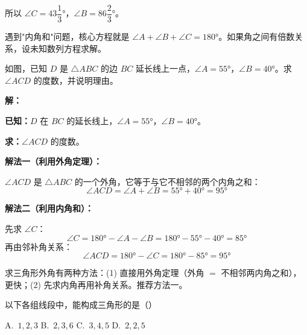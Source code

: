 \documentclass[12pt, a4paper]{ctexart}
\begin{document}
所以 $\angle C = 43\dfrac{1}{3}°$，$\angle B = 86\dfrac{2}{3}°$。

\begin{tipbox}[方法总结]
遇到"内角和"问题，核心方程就是 $\angle A + \angle B + \angle C = 180°$。如果角之间有倍数关系，设未知数列方程求解。
\end{tipbox}

\begin{examplebox}
如图，已知 $D$ 是 $\triangle ABC$ 的边 $BC$ 延长线上一点，$\angle A = 55°$，$\angle B = 40°$。求 $\angle ACD$ 的度数，并说明理由。

\begin{center}
\end{center}
\end{examplebox}

\textbf{解：}

\textbf{已知：}$D$ 在 $BC$ 的延长线上，$\angle A = 55°$，$\angle B = 40°$。

\textbf{求：}$\angle ACD$ 的度数。

\textbf{解法一（利用外角定理）：}

$\angle ACD$ 是 $\triangle ABC$ 的一个外角，它等于与它不相邻的两个内角之和：
\[
\angle ACD = \angle A + \angle B = 55° + 40° = 95°
\]

\textbf{解法二（利用内角和）：}

先求 $\angle C$：
\[
\angle C = 180° - \angle A - \angle B = 180° - 55° - 40° = 85°
\]
再由邻补角关系：
\[
\angle ACD = 180° - \angle C = 180° - 85° = 95°
\]

\begin{tipbox}[方法总结]
求三角形外角有两种方法：(1) 直接用外角定理（外角 $=$ 不相邻两内角之和），更快；(2) 先求内角再用补角关系。推荐方法一。
\end{tipbox}

\begin{examplebox}
以下各组线段中，能构成三角形的是（\quad）

A.\ $1, 2, 3$ \quad B.\ $2, 3, 6$ \quad C.\ $3, 4, 5$ \quad D.\ $2, 2, 5$
\end{examplebox}
\end{document}
